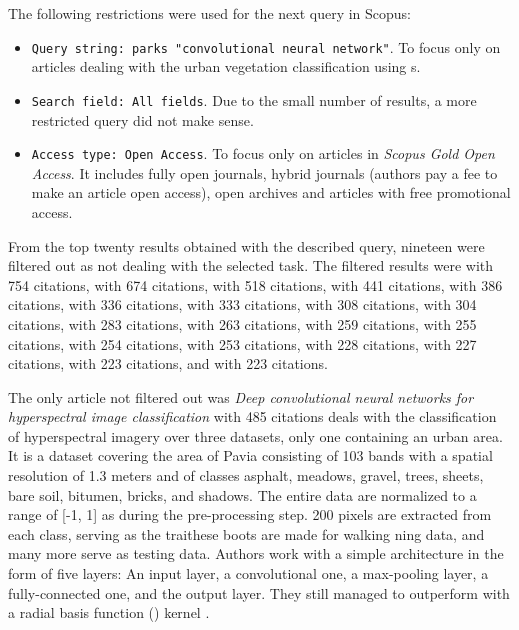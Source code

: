 The following restrictions were used for the next query in Scopus:

\begin{itemize}
	\item \verb|Query string: parks "convolutional neural network"|. To fo\-cus on\-ly on articles dealing with the urban vegetation classification using s.
	\item \verb|Search field: All fields|. Due to the small number of results, a more restricted query did not make sense.
	\item \verb|Access type: Open Access|. To focus only on articles in \textit{Scopus Gold Open Access}. It includes fully open journals, hybrid journals (authors pay a fee to make an article open access), open archives and articles with free promotional access.
\end{itemize}

\noindent From the top twenty results obtained with the described query, nineteen were filtered out as not dealing with the selected task. The filtered results were \cite{dl-dna-rna} with 754 citations, \cite{lstm-activity} with 674 citations, \cite{visual-genome} with 518 citations, \cite{dl-computational-biology} with 441 citations, \cite{text-detection-imagery} with 386 citations, \cite{opportunities-biology-medicine} with 336 citations, \cite{neuromorphic-computing} with 333 citations, \cite{cnn-traffic} with 308 citations, \cite{dnn-plant-diseases} with 304 citations, \cite{dl-for-cv} with 283 citations, \cite{face-classification} with 263 citations, \cite{human-transcription-factors} with 259 citations, \cite{ecg-heartbeat} with 255 citations, \cite{ml-medical-imaging} with 254 citations, \cite{visual-question-answering} with 253 citations, \cite{soli} with 228 citations, \cite{cnn-neuromorphic-computing} with 227 citations, \cite{dl-fault-diagnosis} with 223 citations, and \cite{basset} with 223 citations.

The only article not filtered out was \textit{Deep convolutional neural networks for hyperspectral image classification} \cite{cnn-hs} with 485 citations deals with the classification of hyperspectral imagery over three datasets, only one containing an urban area. It is a dataset covering the area of Pavia consisting of 103 bands with a spatial resolution of 1.3 meters and of classes asphalt, meadows, gravel, trees, sheets, bare soil, bitumen, bricks, and shadows. The entire data are normalized to a range of [-1, 1] as during the pre-processing step. 200 pixels are extracted from each class, serving as the traithese boots are made for walking ning data, and many more serve as testing data. Authors work with a simple  architecture in the form of five layers: An input layer, a convolutional one, a max-pooling layer, a fully-connected one, and the output layer. They still managed to outperform  \cite{svm} with a radial basis function () kernel \cite{rbf-kernel}.

